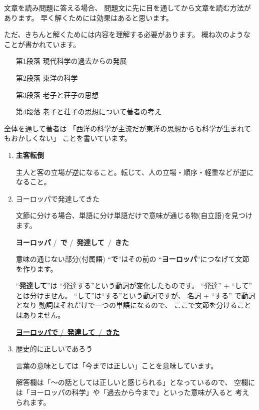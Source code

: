 \documentclass[10pt,b5paper]{ltjsarticle}
\begin{document}
文章を読み問題に答える場合、
問題文に先に目を通してから文章を読む方法があります。
早く解くためには効果はあると思います。

ただ、きちんと解くためには内容を理解する必要があります。
概ね次のようなことが書かれています。
\begin{itemize}
 \item[第1段落] 現代科学の過去からの発展
 \item[第2段落] 東洋の科学
 \item[第3段落] 老子と荘子の思想
 \item[第4段落] 老子と荘子の思想について著者の考え
\end{itemize}
全体を通して著者は
「西洋の科学が主流だが東洋の思想からも科学が生まれてもおかしくない」
ことを書いています。

\begin{enumerate}\renewcommand{\theenumi}{(\arabic{enumi})}
 \item \textbf{主客転倒}

       主人と客の立場が逆になること。転じて、人の立場・順序・軽重などが逆になること。
 \item ヨーロッパで発達してきた

       文節に分ける場合、単語に分け単語だけで意味が通じる物(自立語)を見つけます。

       \textbf{ヨーロッパ} \slash\ \textbf{で} \slash\ \textbf{発達して}\
       \slash\ \textbf{きた}

       意味の通じない部分(付属語) ``\textbf{で}''はその前の
       ``\textbf{ヨーロッパ}''につなげて文節を作ります。

       ``\textbf{発達して}''は
       ``発達する''という動詞が変化したものです。
       ``発達'' + ``して'' とは分けません。
       ``して''は``する''という動詞ですが、
       名詞 + ``する'' で動詞となり
       動詞はそれだけで一つの単語になるので、
       ここで文節を分けることはありません。

       \underline{
       \textbf{ヨーロッパで} \slash\ \textbf{発達して}\
       \slash\ \textbf{きた}
       }

 \item 歴史的に正しいであろう

       言葉の意味としては「今までは正しい」ことを意味しています。

       解答欄は「～の話としては正しいと感じられる」となっているので、
       空欄には「ヨーロッパの科学」や「過去から今まで」といった意味が入ると
       考えられます。


\end{enumerate}
\end{document}
